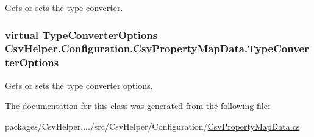 Gets or sets the type converter. 

\hypertarget{a00053_ad0d40cffbecb6c5e43d6aae27c97a214}{
\subsubsection[{Type\-Converter\-Options}]{\setlength{\rightskip}{0pt plus 5cm}virtual {\bf Type\-Converter\-Options} Csv\-Helper.\-Configuration.\-Csv\-Property\-Map\-Data.\-Type\-Converter\-Options\hspace{0.3cm}{\ttfamily [get]}}}\label{a00053_ad0d40cffbecb6c5e43d6aae27c97a214}


Gets or sets the type converter options. 



The documentation for this class was generated from the following file\-:\begin{DoxyCompactItemize}
\item 
packages/\-Csv\-Helper..../src/\-Csv\-Helper/\-Configuration/\hyperlink{a00190}{Csv\-Property\-Map\-Data.\-cs}\end{DoxyCompactItemize}

